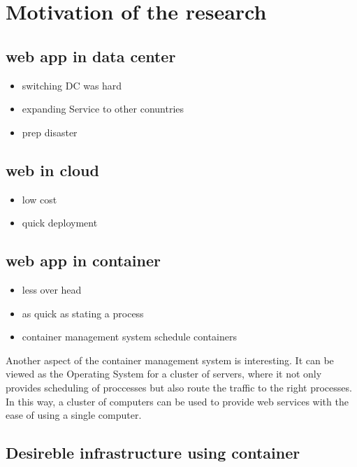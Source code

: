 
\section{Motivation of the research}

\subsection{web app in data center}

\begin{itemize}
\item switching DC was hard 
\item expanding Service to other conuntries
\item prep disaster
\end{itemize}

\subsection{web in cloud}

\begin{itemize}
\item low cost
\item quick deployment
\end{itemize}

\subsection{web app in container}

\begin{itemize}
\item less over head
\item as quick as stating a process
\item container management system schedule containers
\end{itemize}

Another aspect of the container management system is interesting. 
It can be viewed as the Operating System for a cluster of servers, where it not only provides scheduling of proccesses but also route the traffic to the right processes.
In this way, a cluster of computers can be used to provide web services with the ease of using a single computer.


\subsection{Desireble infrastructure using container}

